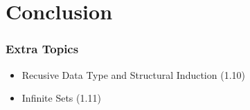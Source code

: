 \documentclass{beamer}
\begin{document}

%
%




\section{Conclusion}
\begin{frame}
  \frametitle{Extra Topics}

  {\larger
    \begin{itemize}
    \item Recusive Data Type and Structural Induction (1.10)

      \vfill
      
    \item Infinite Sets (1.11)
    \end{itemize}
  }
\end{frame}
\end{document}
